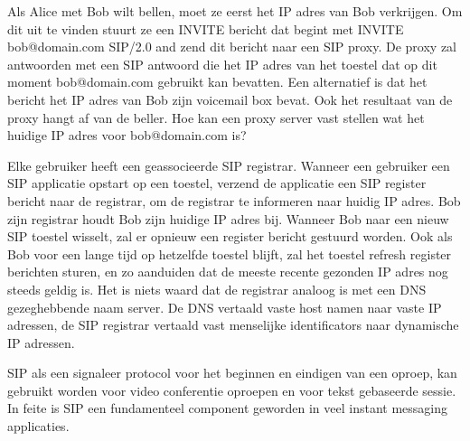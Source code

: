 
\noindent Als Alice met Bob wilt bellen, moet ze eerst het IP adres van Bob verkrijgen. Om dit uit te vinden stuurt ze een INVITE bericht dat begint met INVITE bob@domain.com SIP/2.0 and zend dit bericht naar een SIP proxy. De proxy zal antwoorden met een SIP antwoord die het IP adres van het toestel dat op dit moment bob@domain.com gebruikt kan bevatten. Een alternatief is  dat het bericht het IP adres van Bob zijn voicemail box bevat. Ook het resultaat van de proxy hangt af van de beller. Hoe kan een proxy server vast stellen wat het huidige IP adres voor bob@domain.com is?

\noindent Elke gebruiker heeft een geassocieerde SIP registrar. Wanneer een gebruiker een SIP applicatie opstart op een toestel, verzend de applicatie een SIP register bericht naar de registrar, om de registrar te informeren naar huidig IP adres. Bob zijn registrar houdt Bob zijn huidige IP adres bij. Wanneer Bob naar een nieuw SIP toestel wisselt, zal er opnieuw een register bericht gestuurd worden. Ook als Bob voor een lange tijd op hetzelfde toestel blijft, zal het toestel refresh register berichten sturen, en zo aanduiden dat de meeste recente gezonden IP adres nog steeds geldig is. Het is niets waard dat de registrar analoog is met een DNS gezeghebbende naam server. De DNS vertaald vaste host namen naar vaste IP adressen, de SIP registrar vertaald vast menselijke identificators naar dynamische IP adressen. 

\noindent SIP als een signaleer protocol voor het beginnen en eindigen van een oproep, kan gebruikt worden voor video conferentie oproepen en voor tekst gebaseerde sessie. In feite is SIP een fundamenteel component geworden in veel instant messaging applicaties.
